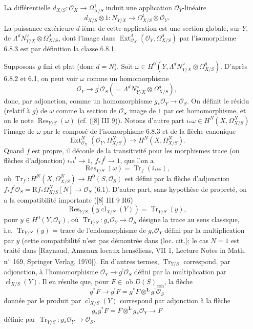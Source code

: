 \documentclass[11pt]{article}
\DeclareMathOperator{\Ext}{Ext}
\newcommand{\R}{\mathrm{R}}\newcommand{\RHomCore}{\mathrm{RHom}}
\newcommand{\ob}{\operatorname{ob}}
\providecommand{\cl}{\operatorname{cl}}
\providecommand{\OO}{\mathcal{O}}
\providecommand{\LL}{\mathbf L}
\providecommand{\coh}{\mathrm{coh}}
\providecommand{\ob}{\operatorname{ob}}
\providecommand{\R}{\mathrm R}
\providecommand{\cl}{\operatorname{cl}}
\providecommand{\coh}{\mathrm{coh}}
\providecommand{\cl}{\operatorname{cl}}
\begin{document}
La différentielle $d_{X/S}:\OO_X\to\Omega^1_{X/S}$ induit une application $\OO_Y$-linéaire
\[
d_{X/S}\otimes 1:N_{Y/X}\longrightarrow \Omega^1_{X/S}\otimes\OO_Y.
\]
La puissance extérieure $d$-ième de cette application est une section globale, sur $Y$, de $\Lambda^d N_{Y/X}^{\vee}\otimes\Omega^d_{X/S}$, dont l'image dans $\Ext^d_{\OO_X}(\OO_Y,\Omega^d_{X/S})$ par l'isomorphisme 6.8.3 est par définition la classe 6.8.1.

Supposons $g$ fini et plat (donc $d=N$). Soit $\omega\in H^0(Y,\Lambda^d N_{Y/X}^{\vee}\otimes\Omega^d_{X/S})$. D'après 6.8.2 et 6.1, on peut voir $\omega$ comme un homomorphisme
\[
\OO_Y\longrightarrow g^!\OO_S(=\Lambda^d N_{Y/X}^{\vee}\otimes\Omega^d_{X/S}),
\]
donc, par adjonction, comme un homomorphisme $g_*\OO_Y\to\OO_S$. On définit le résidu (relatif à $g$) de $\omega$ comme la section de $\OO_S$ image de $1$ par cet homomorphisme, et on le note $\operatorname{Res}_{Y/S}(\omega)$ (cf. ([8] III 9)). Notons d'autre part $i_*\omega\in H^N(X,\Omega^N_{X/S})$ l'image de $\omega$ par le composé de l'isomorphisme 6.8.3 et de la flèche canonique
\[
\Ext^N_{\OO_X}(\OO_Y,\Omega^N_{X/S})\longrightarrow H^N(X,\Omega^N_{X/S}).
\]
Quand $f$ est propre, il découle de la transitivité pour les morphismes trace (ou flèches d'adjonction) $i_*i^!\to 1$, $f_*f^!\to 1$, que l'on a
\begin{equation}
\tag{6.8.4}
\operatorname{Res}_{Y/S}(\omega)=\operatorname{Tr}_f(i_*\omega),
\end{equation}
où $\operatorname{Tr}_f:H^N(X,\Omega^N_{X/S})\to H^0(S,\OO_S)$ est défini par la flèche d'adjonction $f_*f^!\OO_S=\R f_*\Omega^N_{X/S}[N]\to\OO_S$ (6.1). D'autre part, sans hypothèse de propreté, on a la compatibilité importante ([8] III 9 R6)
\begin{equation}
\tag{6.8.5}
\operatorname{Res}_{Y/S}(y\cl_{X/S}(Y))=\operatorname{Tr}_{Y/S}(y),
\end{equation}
pour $y\in H^0(Y,\OO_Y)$, où $\operatorname{Tr}_{Y/S}:g_*\OO_Y\to\OO_S$ désigne la trace au sens classique, i.e. $\operatorname{Tr}_{Y/S}(y)$ = trace de l'endomorphisme de $g_*\OO_Y$ défini par la multiplication par $y$ (cette compatibilité n'est pas démontrée dans (loc. cit.); le cas $N=1$ est traité dans [Raynaud, Anneaux locaux henséliens, VII 1, Lecture Notes in Math. n\textsuperscript{o} 169, Springer Verlag, 1970]). En d'autres termes, $\operatorname{Tr}_{Y/S}$ correspond, par adjonction, à l'homomorphisme $\OO_Y\to g^!\OO_S$ défini par la multiplication par $\cl_{X/S}(Y)$. Il en résulte que, pour $F\in\ob D(S)_{\coh}$, la flèche
\begin{equation}
\tag{6.8.6}
g^*F\longrightarrow g^!F=g^*F\otimes^{\LL}g^!\OO_S
\end{equation}
donnée par le produit par $\cl_{X/S}(Y)$ correspond par adjonction à la flèche
\begin{equation}
\tag{6.8.7}
g_*g^*F=F\otimes^{\LL}g_*\OO_Y\longrightarrow F
\end{equation}
définie par $\operatorname{Tr}_{Y/S}:g_*\OO_Y\to\OO_S$.
\end{document}
